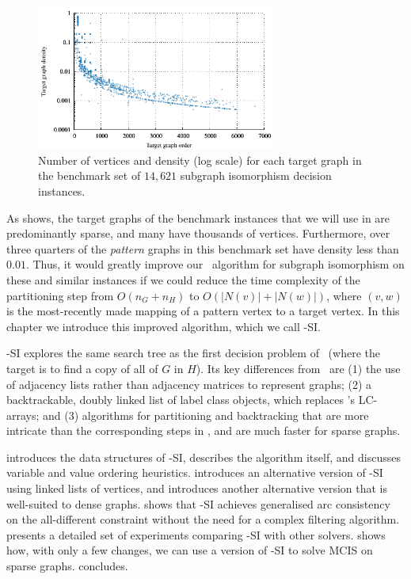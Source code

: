 \begin{figure}[htb]
    \centering
    \includegraphics*[width=0.7\textwidth]{14b-mcsplit-induced-si/density-chart/plots/n-density-pdf}
    \caption{Number of vertices and density (log scale) for each target graph in the benchmark set
    of $14,621$ subgraph isomorphism decision instances.}
    \label{figure:si-targets-n-density}
\end{figure}

As  shows, the target graphs of the benchmark
instances that we will use in  are
predominantly sparse, and many have thousands of vertices.  Furthermore, over three
quarters of the \emph{pattern} graphs in this benchmark set have density less than $0.01$.
Thus, it would greatly improve our \McSplit\ algorithm for subgraph isomorphism
on these and similar instances if we could reduce the time complexity of the
partitioning step from $O(n_G + n_H)$ to $O(|N(v)| + |N(w)|)$, where $(v,w)$ is
the most-recently made mapping of a pattern vertex to a target vertex. In this
chapter we introduce this improved algorithm, which we call \McSplit-SI.

\McSplit-SI explores the same search tree as the first decision problem of
\McSplitDown\ (where the target is to find a copy of all of $G$ in $H$).
Its key differences from
\McSplit\ are (1) the use of adjacency lists rather than adjacency matrices
to represent graphs; (2) a backtrackable, doubly linked list of label class objects,
which replaces \McSplit's LC-arrays;
and (3) algorithms for partitioning and backtracking that are more intricate
than the corresponding steps in \McSplit, and are much faster for sparse graphs.

 introduces the data structures of \McSplit-SI,
 describes the algorithm itself, and
 discusses variable and value ordering heuristics.
 introduces an alternative version of \McSplit-SI
using linked lists of vertices, and
 introduces another alternative version that is
well-suited to dense graphs.
 shows that \McSplit-SI achieves generalised arc consistency
on the all-different constraint without the need for a complex filtering algorithm.
 presents a detailed set of experiments comparing
\McSplit-SI with other solvers.
 shows how, with only a few changes, we can use a version
of \McSplit-SI to solve MCIS on sparse graphs.
 concludes.

